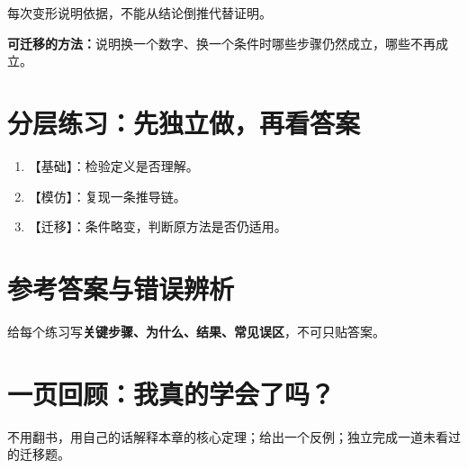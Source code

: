 \documentclass[12pt,a4paper,UTF8,fontset=none]{ctexart}
\begin{document}
 每次变形说明依据，不能从结论倒推代替证明。

\begin{takeawaybox}
\textbf{可迁移的方法：}说明换一个数字、换一个条件时哪些步骤仍然成立，哪些不再成立。
\end{takeawaybox}

\section{分层练习：先独立做，再看答案}
\begin{enumerate}[label=\textbf{A\arabic*.}]
\item 【基础】：检验定义是否理解。
\item 【模仿】：复现一条推导链。
\item 【迁移】：条件略变，判断原方法是否仍适用。
\end{enumerate}

\section{参考答案与错误辨析}
给每个练习写\textbf{关键步骤、为什么、结果、常见误区}，不可只贴答案。

\section{一页回顾：我真的学会了吗？}
\begin{takeawaybox}
不用翻书，用自己的话解释本章的核心定理；给出一个反例；独立完成一道未看过的迁移题。
\end{takeawaybox}
\end{document}
